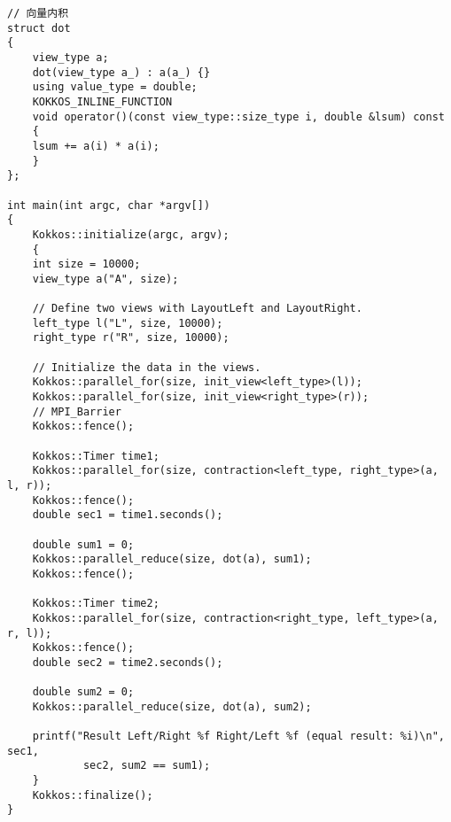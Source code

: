 \begin{lstlisting}
// 向量内积
struct dot
{
    view_type a;
    dot(view_type a_) : a(a_) {}
    using value_type = double;
    KOKKOS_INLINE_FUNCTION
    void operator()(const view_type::size_type i, double &lsum) const
    {
    lsum += a(i) * a(i);
    }
};

int main(int argc, char *argv[])
{
    Kokkos::initialize(argc, argv);
    {
    int size = 10000;
    view_type a("A", size);

    // Define two views with LayoutLeft and LayoutRight.
    left_type l("L", size, 10000);
    right_type r("R", size, 10000);

    // Initialize the data in the views.
    Kokkos::parallel_for(size, init_view<left_type>(l));
    Kokkos::parallel_for(size, init_view<right_type>(r));
    // MPI_Barrier
    Kokkos::fence();

    Kokkos::Timer time1;
    Kokkos::parallel_for(size, contraction<left_type, right_type>(a, l, r));
    Kokkos::fence();
    double sec1 = time1.seconds();

    double sum1 = 0;
    Kokkos::parallel_reduce(size, dot(a), sum1);
    Kokkos::fence();

    Kokkos::Timer time2;
    Kokkos::parallel_for(size, contraction<right_type, left_type>(a, r, l));
    Kokkos::fence();
    double sec2 = time2.seconds();

    double sum2 = 0;
    Kokkos::parallel_reduce(size, dot(a), sum2);

    printf("Result Left/Right %f Right/Left %f (equal result: %i)\n", sec1,
            sec2, sum2 == sum1);    
    }
    Kokkos::finalize();
}
\end{lstlisting}